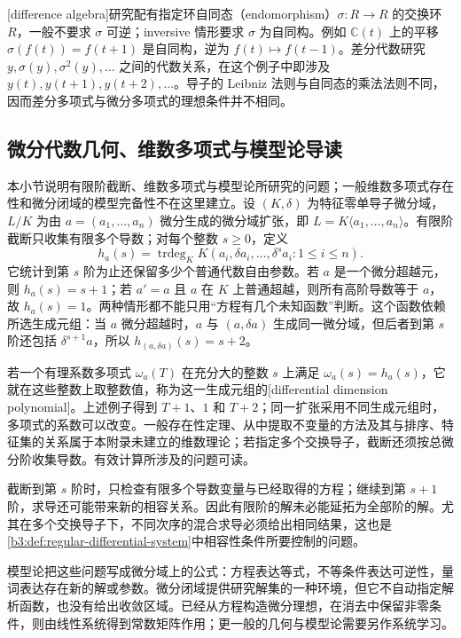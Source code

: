 \ProseParagraphBreak
{}[difference algebra]研究配有指定环自同态（endomorphism）\(\sigma:R\to R\) 的交换环 \(R\)，一般不要求 \(\sigma\) 可逆；inversive 情形要求 \(\sigma\) 为自同构。例如 \(\mathbb C(t)\) 上的平移 \(\sigma(f(t))=f(t+1)\) 是自同构，逆为 \(f(t)\mapsto f(t-1)\)。差分代数研究 \(y,\sigma(y),\sigma^2(y),\ldots\) 之间的代数关系，在这个例子中即涉及 \(y(t),y(t+1),y(t+2),\ldots\)。导子的 Leibniz 法则与自同态的乘法法则不同，因而差分多项式与微分多项式的理想条件并不相同。

\subsection{微分代数几何、维数多项式与模型论导读}
\label{b3:subsec:E04:03}

本小节说明有限阶截断、维数多项式与模型论所研究的问题；一般维数多项式存在性和微分闭域的模型完备性不在这里建立。设 \((K,\delta)\) 为特征零单导子微分域，\(L/K\) 为由 \(a=(a_1,\ldots,a_n)\) 微分生成的微分域扩张，即 \(L=K\langle a_1,\ldots,a_n\rangle\)。有限阶截断只收集有限多个导数；对每个整数 \(s\ge0\)，定义
\[
	h_a(s)=\operatorname{trdeg}_K K(a_i,\delta a_i,\ldots,\delta^sa_i:1\le i\le n).
\]
它统计到第 \(s\) 阶为止还保留多少个普通代数自由参数。若 \(a\) 是一个微分超越元，则 \(h_a(s)=s+1\)；若 \(a'=a\) 且 \(a\) 在 \(K\) 上普通超越，则所有高阶导数等于 \(a\)，故 \(h_a(s)=1\)。两种情形都不能只用“方程有几个未知函数”判断。这个函数依赖所选生成元组：当 \(a\) 微分超越时，\(a\) 与 \((a,\delta a)\) 生成同一微分域，但后者到第 \(s\) 阶还包括 \(\delta^{s+1}a\)，所以 \(h_{(a,\delta a)}(s)=s+2\)。

\ProseParagraphBreak
若一个有理系数多项式 \(\omega_a(T)\) 在充分大的整数 \(s\) 上满足 \(\omega_a(s)=h_a(s)\)，它就在这些整数上取整数值，称为这一生成元组的[differential dimension polynomial]。上述例子得到 \(T+1\)、\(1\) 和 \(T+2\)；同一扩张采用不同生成元组时，多项式的系数可以改变。一般存在性定理、从中提取不变量的方法及其与排序、特征集的关系属于本附录未建立的维数理论；若指定多个交换导子，截断还须按总微分阶收集导数。有效计算所涉及的问题可读\cite[Section 1]{Hubert2003DifferentialSystems}。

\ProseParagraphBreak
截断到第 \(s\) 阶时，只检查有限多个导数变量与已经取得的方程；继续到第 \(s+1\) 阶，求导还可能带来新的相容关系。因此有限阶的解未必能延拓为全部阶的解。尤其在多个交换导子下，不同次序的混合求导必须给出相同结果，这也是\cref{b3:def:regular-differential-system}中相容性条件所要控制的问题。

\ProseParagraphBreak
模型论把这些问题写成微分域上的公式：方程表达等式，不等条件表达可逆性，量词表达存在新的解或参数。微分闭域提供研究解集的一种环境，但它不自动指定解析函数，也没有给出收敛区域。已经从方程构造微分理想，在消去中保留非零条件，则由线性系统得到常数矩阵作用；更一般的几何与模型论需要另作系统学习。
